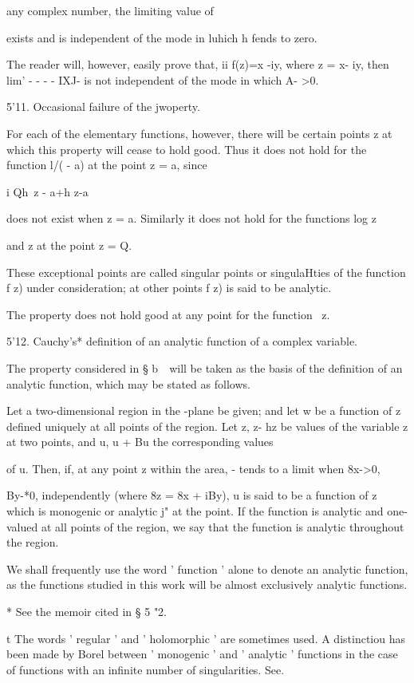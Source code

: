 %
%
any complex
number, the limiting value of

exists and is independent of the mode in luhich h fends to zero.

The reader will, however, easily prove that, ii f(z)=x -iy, where z =
x- iy, then lim' - - - - IXJ- is not independent of the mode in which
A- >0.

5'11. Occasional failure of the jwoperty.

For each of the elementary functions, however, there will be certain
points z at which this property will cease to hold good. Thus it does
not hold for the function l/( - a) at the point z = a, since

 i Qh\ z - a+h z-a

does not exist when z = a. Similarly it does not hold for the
functions log z

and z at the point z = Q.

These exceptional points are called singular points or singulaHties of
the function f z) under consideration; at other points f z) is said
to be analytic.

The property does not hold good at any point for the function \ z.

5'12. Cauchy's* definition of an analytic function of a complex
variable.

The property considered in § b\ \ will be taken as the basis of the
definition of an analytic function, which may be stated as follows.

Let a two-dimensional region in the -plane be given; and let w be a
function of z defined uniquely at all points of the region. Let z, z-
hz be values of the variable z at two points, and u, u + Bu the
corresponding values

of u. Then, if, at any point z within the area, - tends to a limit
when 8x->0,

By-*0, independently (where 8z = 8x + iBy), u is said to be a function
of z which is monogenic or analytic j" at the point. If the function
is analytic and one-valued at all points of the region, we say that
the function is analytic throughout the region.

We shall frequently use the word ' function ' alone to denote an
analytic function, as the functions studied in this work will be
almost exclusively analytic functions.

* See the memoir cited in § 5 "2.

t The words ' regular ' and ' holomorphic ' are sometimes used. A
distinctiou has been made by Borel between ' monogenic ' and '
analytic ' functions in the case of functions with an infinite number
of singularities. See.

